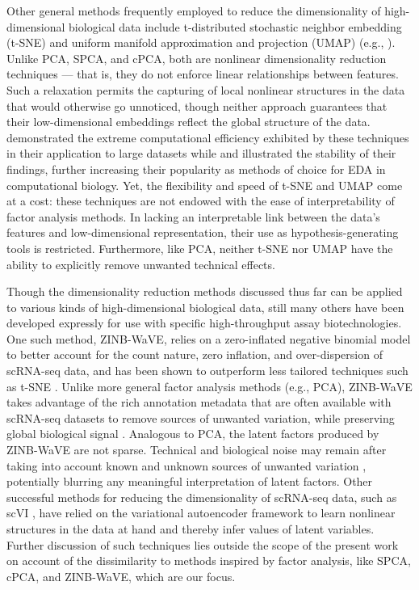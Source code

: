 Other general methods frequently employed to reduce the dimensionality of high-dimensional biological data include t-distributed stochastic neighbor embedding (t-SNE) \cite{Maaten08visualizingdata} and uniform manifold approximation and projection (UMAP) \cite{McInnes2018} (e.g., \cite{Amir2013, Becht2019}). Unlike PCA, SPCA, and cPCA, both are nonlinear dimensionality reduction techniques --- that is, they do not enforce linear relationships between features. Such a relaxation permits the capturing of local nonlinear structures in the data that would otherwise go unnoticed, though neither approach guarantees that their low-dimensional embeddings reflect the global structure of the data. \citet{Becht2019} demonstrated the extreme computational efficiency exhibited by these techniques in their application to large datasets while \citet{Amir2013} and \citet{Becht2019} illustrated the stability of their findings, further increasing their popularity as methods of choice for EDA in computational biology. Yet, the flexibility and speed of t-SNE and UMAP come at a cost: these techniques are not endowed with the ease of interpretability of factor analysis methods. In lacking an interpretable link between the data's features and low-dimensional representation, their use as hypothesis-generating tools is restricted. Furthermore, like PCA, neither t-SNE nor UMAP have the ability to explicitly remove unwanted technical effects.

Though the dimensionality reduction methods discussed thus far can be applied to various kinds of high-dimensional biological data, still many others have been developed expressly for use with specific high-throughput assay biotechnologies. One such method, ZINB-WaVE, relies on a zero-inflated negative binomial model to better account for the count nature, zero inflation, and over-dispersion of scRNA-seq data, and has been shown to outperform less tailored techniques such as t-SNE \cite{risso2017zinb}. Unlike more general factor analysis methods (e.g., PCA), ZINB-WaVE takes advantage of the rich annotation metadata that are often available with scRNA-seq datasets to remove sources of unwanted variation, while preserving global biological signal \cite{risso2017zinb}. Analogous to PCA, the latent factors produced by ZINB-WaVE are not sparse. Technical and biological noise may remain after taking into account known and unknown sources of unwanted variation \cite{risso2017zinb}, potentially blurring any meaningful interpretation of latent factors. Other successful methods for reducing the dimensionality of scRNA-seq data, such as scVI \cite{Lopez2018}, have relied on the variational autoencoder framework to learn nonlinear structures in the data at hand and thereby infer values of latent variables. Further discussion of such techniques lies outside the scope of the present work on account of the dissimilarity to methods inspired by factor analysis, like SPCA, cPCA, and ZINB-WaVE, which are our focus.